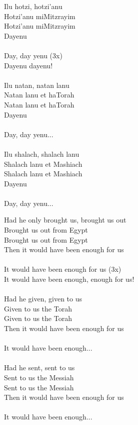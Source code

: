 \documentclass[10pt,oneside,footinclude=true,headinclude=true]{scrbook} %
\begin{document}
\footnotesize
{}
\begin{paracol}{2}
\begin{leftcolumn}
\noindent Ilu hotzi, hotzi'anu\\
Hotzi'anu miMitzrayim\\
Hotzi'anu miMitzrayim\\
Dayenu\\
\\
Day, day yenu (3x)\\
Dayenu dayenu!\\
\\
Ilu natan, natan lanu\\
Natan lanu et haTorah\\
Natan lanu et haTorah\\
Dayenu\\
\\
Day, day yenu...\\
\\
Ilu shalach, shalach lanu\\
Shalach lanu et Mashiach\\
Shalach lanu et Mashiach\\
Dayenu\\
\\
Day, day yenu...\\
\end{leftcolumn}
\begin{rightcolumn}
\noindent Had he only brought us, brought us out\\
Brought us out from Egypt\\
Brought us out from Egypt\\
Then it would have been enough for us\\
\\
It would have been enough for us (3x)\\
It would have been enough, enough for us!\\
\\
Had he given, given to us\\
Given to us the Torah\\
Given to us the Torah\\
Then it would have been enough for us\\
\\
It would have been enough...\\
\\
Had he sent, sent to us\\
Sent to us the Messiah\\
Sent to us the Messiah\\
Then it would have been enough for us\\
\\
It would have been enough...\\
\end{rightcolumn}
\end{paracol}
\end{document}
